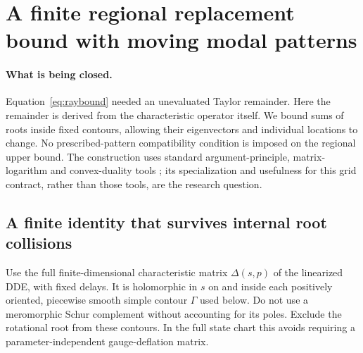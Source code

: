 \section{A finite regional replacement bound with moving modal patterns}
\label{sec:regional}

\paragraph{What is being closed.}
Equation~\eqref{eq:raybound} needed an unevaluated Taylor remainder.
Here the remainder is derived from the characteristic operator itself.
We bound sums of roots inside fixed contours, allowing their eigenvectors
and individual locations to change. No prescribed-pattern compatibility
condition is imposed on the regional upper bound. The construction uses
standard argument-principle, matrix-logarithm and convex-duality tools
\cite{beyn,lessard}; its specialization and usefulness for this grid
contract, rather than those tools, are the research question.

\subsection{A finite identity that survives internal root collisions}
Use the full finite-dimensional characteristic matrix
$\Delta(s,p)$ of the linearized DDE, with fixed delays.
It is holomorphic in $s$ on and inside each positively oriented,
piecewise smooth simple contour $\Gamma$ used below.
Do not use a meromorphic Schur complement without accounting for its poles.
Exclude the rotational root from these contours. In the full state chart
this avoids requiring a parameter-independent gauge-deflation matrix.

